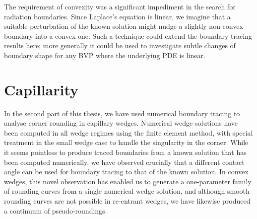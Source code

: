 The requirement of convexity was a significant impediment
in the search for radiation boundaries.
Since Laplace's equation is linear,
we imagine that a suitable perturbation of the known solution
might nudge a slightly non-convex boundary
into a convex one.
Such a technique could extend the boundary tracing results here;
more generally it could be used to investigate
subtle changes of boundary shape
for any BVP where the underlying PDE is linear.

\section{Capillarity}
\label{sec:concluding.capillarity}

In the second part of this thesis,
we have used numerical boundary tracing
to analyse corner rounding in capillary wedges.
Numerical wedge solutions have been computed in all wedge regimes
using the finite element method,
with special treatment in the small wedge case
to handle the singularity in the corner.
While it seems pointless to produce traced boundaries
from a known solution that has been computed numerically,
we have observed crucially that
a different contact angle can be used for boundary tracing
to that of the known solution.
In convex wedges,
this novel observation has enabled us to generate
a one-parameter family of rounding curves
from a single numerical wedge solution,
and although smooth rounding curves
are not possible in re-entrant wedges,
we have likewise produced a continuum of pseudo-roundings.
